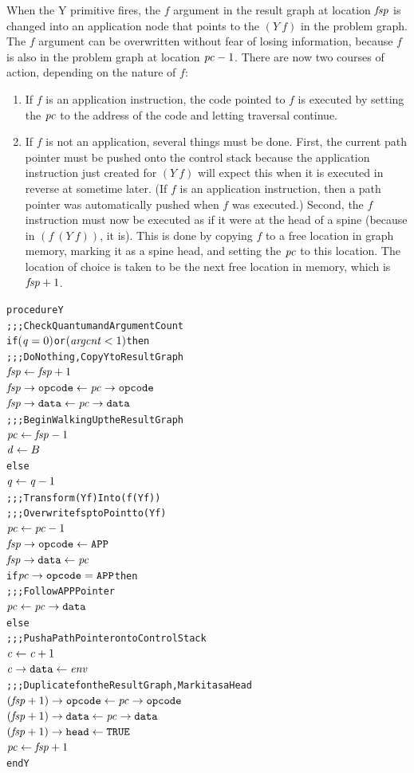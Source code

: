 When the Y primitive fires, the \(f\) argument in the result graph at location \(\mathit{fsp}\) is
changed into an application node that points to the \((Y\ f)\) in the problem graph. The
\(f\) argument can be overwritten without fear of losing information, because \(f\) is also
in the problem graph at location \(\mathit{pc}-1\). There are now two courses of action, depending
on the nature of \(f\):

\begin{enumerate}
\item If \(f\) is an application instruction, the code pointed to \(f\) is executed by
setting the \(\mathit{pc}\) to the address of the code and letting traversal continue.

\item If \(f\) is not an application, several things must be done. First, the current path
pointer must be pushed onto the control stack because the application instruction just
created
for \((Y\ f)\) will expect this when it is executed in reverse at sometime later. (If \(f\)
is an application instruction, then a path pointer was automatically pushed when \(f\) was
executed.) Second, the \(f\) instruction must now be executed as if it were at the head of
a spine (because in \((f\ (Y\ f))\), it is). This is done by copying \(f\) to a free
location in graph memory, marking it as a spine head, and setting the \(\mathit{pc}\) to this
location. The location of choice is taken to be the next free location in memory, which is
\(\mathit{fsp}+1\).
\end{enumerate}

\par\smallskip\noindent\begin{minipage}{\linewidth}
\begin{alltt}
procedure Y
  \textrm{;;; Check Quantum and Argument Count}
  if \((\rt{q} = 0)\) or \((\rt{argcnt} < 1)\) then
    \textrm{;;; Do Nothing, Copy Y to Result Graph}
    \(\rt{fsp} \leftarrow \rt{fsp}+1\)
    \(\rtfield{fsp}{opcode} \leftarrow \rtfield{pc}{opcode}\)
    \(\rtfield{fsp}{data} \leftarrow \rtfield{pc}{data}\)
    \textrm{;;; Begin Walking Up the Result Graph}
    \(\rt{pc} \leftarrow \rt{fsp}-1\)
    \(\rt{d} \leftarrow B\)
  else
    \(\rt{q} \leftarrow \rt{q}-1\)
    \textrm{;;; Transform (Y f) Into (f (Y f))}
    \textrm{;;; Overwrite fsp to Point to (Y f)}
    \(\rt{pc} \leftarrow \rt{pc}-1\)
    \(\rtfield{fsp}{opcode} \leftarrow \mathtt{APP}\)
    \(\rtfield{fsp}{data} \leftarrow \rt{pc}\)
    if \(\rtfield{pc}{opcode} = \mathtt{APP}\) then
      \textrm{;;; Follow APP Pointer}
      \(\rt{pc} \leftarrow \rtfield{pc}{data}\)
    else
      \textrm{;;; Push a Path Pointer onto Control Stack}
      \(\rt{c} \leftarrow \rt{c}+1\)
      \(\rtfield{c}{data} \leftarrow \rt{env}\)
      \textrm{;;; Duplicate f on the Result Graph, Mark it as a Head}
      \((\rt{fsp}+1)\rightarrow\mathtt{opcode} \leftarrow \rtfield{pc}{opcode}\)
      \((\rt{fsp}+1)\rightarrow\mathtt{data} \leftarrow \rtfield{pc}{data}\)
      \((\rt{fsp}+1)\rightarrow\mathtt{head} \leftarrow \mathtt{TRUE}\)
    \(\rt{pc} \leftarrow \rt{fsp}+1\)
end Y
\end{alltt}
\end{minipage}\par\smallskip


